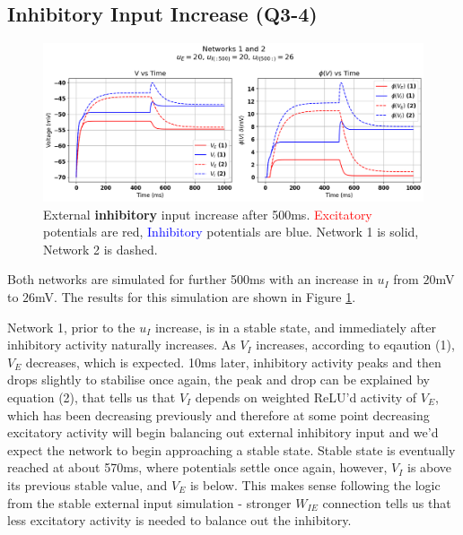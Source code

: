 \documentclass[10pt,twocolumn]{article}
\begin{document}
\subsection{Inhibitory Input Increase (Q3-4)}
\begin{figure}
    \centering
    \captionsetup{justification=centering}
    \includegraphics[width=1\textwidth]{images/12-I_input.png}
    \caption{External \textbf{inhibitory} input increase after 500ms.\hspace{\textwidth}
        \textcolor{red}{Excitatory} potentials are red, \textcolor{blue}{Inhibitory} potentials are blue.\hspace{\textwidth}
        Network 1 is solid, Network 2 is dashed.}
    \label{fig:i-input}
\end{figure}

Both networks are simulated for further 500ms with
an increase in $u_I$ from $20$mV to $26$mV. The results for
this simulation are shown in Figure \ref{fig:i-input}.

Network 1, prior to the $u_I$ increase, is in a stable state, and immediately after
inhibitory activity naturally increases. As $V_I$ increases, according to
eqaution (1), $V_E$ decreases, which is expected. 10ms later, inhibitory activity
peaks and then drops slightly to stabilise once again, the peak and drop can be
explained by equation (2), that tells us that $V_I$ depends on weighted ReLU'd
activity of $V_E$, which has been decreasing previously and therefore at some point
decreasing excitatory activity will begin balancing out external inhibitory input
and we'd expect the network to begin approaching a stable state. Stable state
is eventually reached at about 570ms, where potentials settle once again, however,
$V_I$ is above its previous stable value, and $V_E$ is below. This makes sense
following the logic from the stable external input simulation - stronger $W_{IE}$
connection tells us that less excitatory activity is needed to
balance out the inhibitory.
\end{document}
